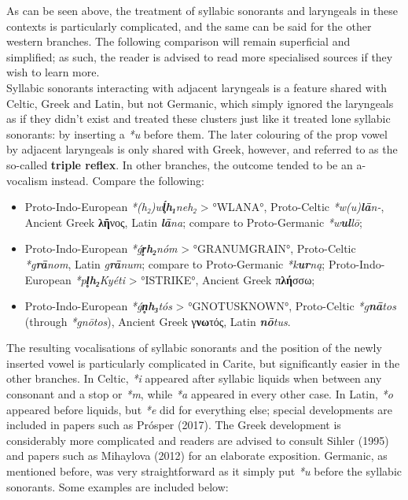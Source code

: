 \documentclass[svgnames,x11names,b5paper]{book}
\begin{document}
            As can be seen above, the treatment of syllabic sonorants and laryngeals in these contexts is particularly complicated, and the same can be said for the other western branches. The following comparison will remain superficial and simplified; as such, the reader is advised to read more specialised sources if they wish to learn more.\\
Syllabic sonorants interacting with adjacent laryngeals is a feature shared with Celtic, Greek and Latin, but not Germanic, which simply ignored the laryngeals as if they didn't exist and treated these clusters just like it treated lone syllabic sonorants: by inserting a \textit{*u} before them. The later colouring of the prop vowel by adjacent laryngeals is only shared with Greek, however, and referred to as the so-called \textbf{triple reflex}. In other branches, the outcome tended to be an a-vocalism instead. Compare the following:
\begin{itemize}
\item  Proto-Indo-European \textit{*(h₂)w\textbf{ĺ̥h₁}neh₂} > °WLANA°, Proto-Celtic \textit{*w(u)\textbf{lā}n-}, Ancient Greek \textbf{λῆ}νος, Latin \textit{\textbf{lā}na}; compare to Proto-Germanic \textit{*w\textbf{ul}lō};\\
\item  Proto-Indo-European \textit{*ǵ\textbf{r̥h₂}nóm} > °GRANUMGRAIN°, Proto-Celtic \textit{*g\textbf{rā}nom}, Latin \textit{g\textbf{rā}num}; compare to Proto-Germanic \textit{*k\textbf{ur}ną}; Proto-Indo-European \textit{*p\textbf{l̥h₂}Kyéti} > °ISTRIKE°, Ancient Greek π\textbf{λή}σσω;\\
\item  Proto-Indo-European \textit{*ǵ\textbf{n̥h₃}tós} > °GNOTUSKNOWN°, Proto-Celtic \textit{*g\textbf{nā}tos} (through \textit{*gnōtos}), Ancient Greek γ\textbf{νω}τός, Latin \textit{\textbf{nō}tus}.\\
\end{itemize}
The resulting vocalisations of syllabic sonorants and the position of the newly inserted vowel is particularly complicated in Carite, but significantly easier in the other branches. In Celtic, \textit{*i} appeared after syllabic liquids when between any consonant and a stop or \textit{*m}, while \textit{*a} appeared in every other case. In Latin, \textit{*o} appeared before liquids, but \textit{*e} did for everything else; special developments are included in papers such as Prósper (2017). The Greek development is considerably more complicated and readers are advised to consult Sihler (1995) and papers such as Mihaylova (2012) for an elaborate exposition. Germanic, as mentioned before, was very straightforward as it simply put \textit{*u} before the syllabic sonorants. Some examples are included below:
\end{document}
